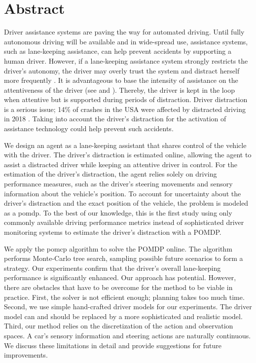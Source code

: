 \chapter{Abstract}
\label{sec:abstrac}

Driver assistance systems are paving the way for automated driving. Until fully autonomous driving will be available and in wide-spread use, assistance systems, such as lane-keeping assistance, can help prevent accidents by supporting a human driver. However, if a lane-keeping assistance system strongly restricts the driver's autonomy, the driver may overly trust the system \parencite{over-trust} and distract herself more frequently \parencite{driver-distraction}. It is advantageous to base the intensity of assistance on the attentiveness of the driver (see \cite{disracted-lane-keeping-1} and \cite{disracted-lane-keeping-2}). Thereby, the driver is kept in the loop when attentive but is supported during periods of distraction. Driver distraction is a serious issue; 14\% of crashes in the USA were affected by distracted driving in 2018 \parencite{distracted_nhtsa}. Taking into account the driver's distraction for the activation of assistance technology could help prevent such accidents.

We design an agent as a lane-keeping assistant that shares control of the vehicle with the driver. The driver's distraction is estimated online, allowing the agent to assist a distracted driver while keeping an attentive driver in control. For the estimation of the driver's distraction, the agent relies solely on driving performance measures, such as the driver's steering movements and sensory information about the vehicle's position. To account for uncertainty about the driver's distraction and the exact position of the vehicle, the problem is modeled as a \acrfull{pomdp}. To the best of our knowledge, this is the first study using only commonly available driving performance metrics instead of sophisticated driver monitoring systems to estimate the driver's distraction with a POMDP.

We apply the \acrfull{pomcp} algorithm \parencite{pomcp} to solve the POMDP online. The algorithm performs Monte-Carlo tree search, sampling possible future scenarios to form a strategy. Our experiments confirm that the driver's overall lane-keeping performance is significantly enhanced. Our approach has potential. However, there are obstacles that have to be overcome for the method to be viable in practice. First, the solver is not efficient enough; planning takes too much time. Second, we use simple hand-crafted driver models for our experiments. The driver model can and should be replaced by a more sophisticated and realistic model. Third, our method relies on the discretization of the action and observation spaces. A car's sensory information and steering actions are naturally continuous. We discuss these limitations in detail and provide suggestions for future improvements.


